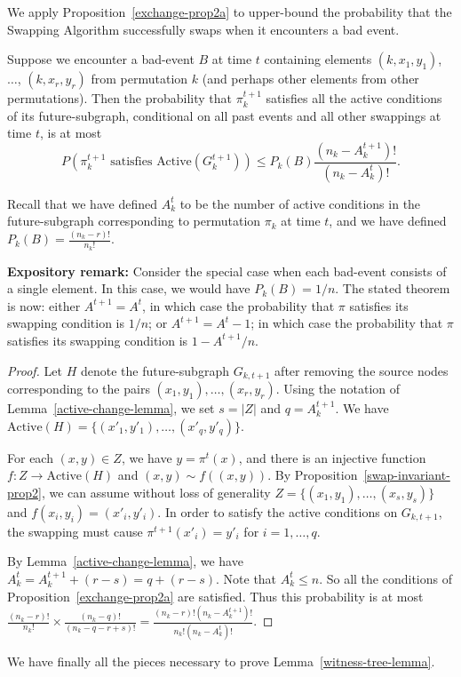 We apply Proposition~\ref{exchange-prop2a} to upper-bound the probability that the Swapping Algorithm successfully swaps when it encounters a bad event.
\begin{proposition}
\label{exchange-prop2}
Suppose we encounter a bad-event $B$ at time $t$ containing elements $(k, x_1, y_1)$, $\dots$, $(k, x_r, y_r)$ from permutation $k$ (and perhaps other elements from other permutations).
Then the probability that $\pi^{t+1}_k$ satisfies all the active conditions of its future-subgraph, conditional on all past events and all other swappings at time $t$, is at most 
$$
P(\text{$\pi_k^{t+1}$ satisfies $\text{Active}(G_{k}^{t+1})$}) \leq P_k(B) \frac{ (n_k - A_k^{t+1})!}{(n_k - A_k^t)!}.
$$


Recall that we have defined $A_{k}^t$ to be the number of active conditions in the future-subgraph corresponding to permutation $\pi_k$ at time $t$, and we have defined $P_k(B) = \frac{(n_k - r)!}{n_k!}.$

\textbf{Expository remark:} Consider the special case when each bad-event consists of a single element. In this case, we would have $P_k(B) = 1/n$. The stated theorem is now: either $A^{t+1} = A^t$, in which case the probability that $\pi$ satisfies its swapping condition is $1/n$; or $A^{t+1} = A^t - 1$; in which case the probability that $\pi$ satisfies its swapping condition is $1 - A^{t+1}/n$.
\end{proposition}
\begin{proof}
Let $H$ denote the future-subgraph $G_{k, t+1}$ after removing the source nodes corresponding to the pairs $(x_1, y_1), \dots, (x_{r}, y_{r})$. Using the notation of Lemma~\ref{active-change-lemma}, we set $s = |Z|$ and $q = A_k^{t+1}$. We have $\text{Active}(H) = \{ (x'_1, y'_1), \dots, (x'_{q}, y'_{q}) \}$.

For each $(x,y) \in Z$, we have $y = \pi^t(x)$, and there is an injective function $f: Z \rightarrow \text{Active}(H)$ and $(x,y) \sim f((x,y))$. By Proposition~\ref{swap-invariant-prop2}, we can assume without loss of generality $Z = \{(x_1, y_1), \dots, (x_s, y_s) \}$ and $f(x_i, y_i) = (x'_i,  y'_i)$. In order to satisfy the active conditions on $G_{k, t+1}$, the swapping must cause $\pi^{t+1} ( x'_i ) = y'_i$ for $i = 1, \dots, q$.

By Lemma~\ref{active-change-lemma}, we have $A_{k}^t = A_{k}^{t+1} + (r - s) = q + (r - s)$. Note that $A_k^t \leq n$. So all the conditions of Proposition~\ref{exchange-prop2a} are satisfied. Thus this probability is at most $\frac{(n_k-r)!}{n_k!} \times \frac{(n_k-q)!}{ (n_k-q-r+s)!} = \frac{ (n_k-r)! (n_k - A_{k}^{t+1})!}{n_k! (n_k - A_k^t)!}$.
\end{proof}
We have finally all the pieces necessary to prove Lemma~\ref{witness-tree-lemma}.

